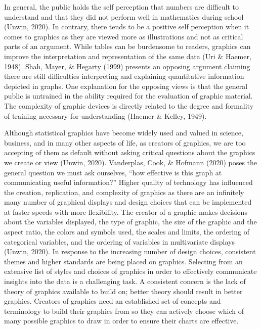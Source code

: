 \documentclass[print]{nuthesis}
\begin{document}
In general, the public holds the self perception that numbers are difficult to understand and that they did not perform well in mathematics during school (Unwin, 2020).
In contrary, there tends to be a positive self perception when it comes to graphics as they are viewed more as illustrations and not as critical parts of an argument.
While tables can be burdensome to readers, graphics can improve the interpretation and representation of the same data (Uri \& Haemer, 1948).
Shah, Mayer, \& Hegarty (1999) presents an opposing argument claiming there are still difficulties interpreting and explaining quantitative information depicted in graphs. 
One explanation for the opposing views is that the general public is untrained in the ability required for the evaluation of graphic material.
The complexity of graphic devices is directly related to the degree and formality of training necessary for understanding (Haemer \& Kelley, 1949). 

Although statistical graphics have become widely used and valued in science, business, and in many other aspects of life, as creators of graphics, we are too accepting of them as default without asking critical questions about the graphics we create or view (Unwin, 2020).
Vanderplas, Cook, \& Hofmann (2020) poses the general question we must ask ourselves, ``how effective is this graph at communicating useful information?''
Higher quality of technology has influenced the creation, replication, and complexity of graphics as there are an infinitely many number of graphical displays and design choices that can be implemented at faster speeds with more flexibility.
The creator of a graphic makes decisions about the variables displayed, the type of graphic, the size of the graphic and the aspect ratio, the colors and symbols used, the scales and limits, the ordering of categorical variables, and the ordering of variables in multivariate displays (Unwin, 2020).
In response to the increasing number of design choices, consistent themes and higher standards are being placed on graphics.
Selecting from an extensive list of styles and choices of graphics in order to effectively communicate insights into the data is a challenging task.
A consistent concern is the lack of theory of graphics available to build on; better theory should result in better graphics.
Creators of graphics need an established set of concepts and terminology to build their graphics from so they can actively choose which of many possible graphics to draw in order to ensure their charts are effective.
\end{document}

